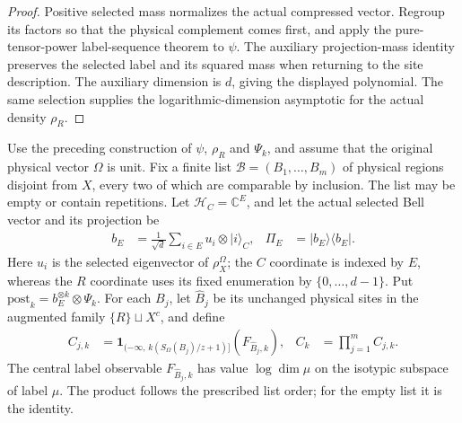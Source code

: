 \begin{proof}
    \leanok
    Positive selected mass normalizes the actual compressed vector.
    Regroup its factors so that the physical complement comes first,
    and apply the pure-tensor-power label-sequence theorem to $\psi$.
    The auxiliary projection-mass identity preserves the selected label
    and its squared mass when returning to the site description.
    The auxiliary dimension is $d$, giving the displayed polynomial.
    The same selection supplies the logarithmic-dimension asymptotic
    for the actual density $\rho_R$.
\end{proof}

\begin{theorem}
    \label{thm:compressed_typical_label_sequence_common_bell_vector}
    \leanok
    Use the preceding construction of $\psi$, $\rho_R$ and $\Psi_k$,
    and assume that the original physical vector $\Omega$ is unit.
    Fix a finite list
    $\mathcal B=(B_1,\ldots,B_m)$ of physical regions disjoint from $X$,
    every two of which are comparable by inclusion. The list may be empty
    or contain repetitions.
    Let $\mathcal H_C=\mathbb C^E$, and let the actual selected Bell vector
    and its projection be
    \begin{align*}
        b_E&=\frac{1}{\sqrt d}\sum_{i\in E}u_i\otimes|i\rangle_C,
        &\Pi_E&=|b_E\rangle\langle b_E|.
    \end{align*}
    Here $u_i$ is the selected eigenvector of $\rho_X^\Omega$;
    the $C$ coordinate is indexed by $E$, whereas the $R$ coordinate
    uses its fixed enumeration by $\{0,\ldots,d-1\}$.
    Put
    $\mathrm{post}_k=b_E^{\otimes k}\otimes\Psi_k$.
    For each $B_j$, let $\widehat B_j$ be its unchanged physical sites
    in the augmented family $\{R\}\sqcup X^c$, and define
    \begin{align*}
        C_{j,k}&=\mathbf 1_{(-\infty,\,k(S_\Omega(B_j)/z+1)]}
            (F_{\widehat B_j,k}),
        &C_k&=\prod_{j=1}^m C_{j,k}.
    \end{align*}
    The central label observable $F_{\widehat B_j,k}$ has value
    $\log\dim\mu$ on the isotypic subspace of label $\mu$.
    The product follows the prescribed list order; for the empty list
    it is the identity.


\end{theorem}
